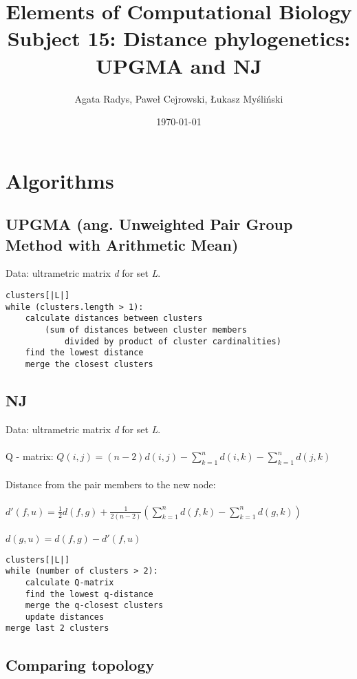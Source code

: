 \documentclass[a4paper,10pt]{article}
\title{Elements of Computational Biology\\ \Large
Subject 15: Distance phylogenetics: UPGMA and NJ}
\author{Agata Radys, Paweł Cejrowski, Łukasz Myśliński}
\date{\today}
\begin{document}
\maketitle

\section{Algorithms}

\subsection{UPGMA (ang. Unweighted Pair Group Method with Arithmetic Mean)}
Data: ultrametric matrix \textit{d} for set \textit{L}.
\begin{lstlisting}[caption={UPGMA pseudocode}]
clusters[|L|]
while (clusters.length > 1):
    calculate distances between clusters
        (sum of distances between cluster members
            divided by product of cluster cardinalities)
    find the lowest distance
    merge the closest clusters
\end{lstlisting}

\subsection{NJ}
Data: ultrametric matrix \textit{d} for set \textit{L}.\\ \\
Q - matrix: $ Q(i,j) = (n-2)d(i,j) - \sum_{k=1}^{n} d(i,k) - \sum_{k=1}^{n} d(j,k)$ \\ \\
Distance from the pair members to the new node: \\ \\
$d'(f,u) = \frac{1}{2}d(f,g) + \frac{1}{2(n-2)}(\sum_{k=1}^n d(f,k) - \sum_{k=1}^n d(g,k))$ \\ \\
$d(g,u) = d(f,g) - d'(f,u)$

\begin{lstlisting}[caption={NJ pseudocode}]
clusters[|L|]
while (number of clusters > 2):
    calculate Q-matrix
    find the lowest q-distance
    merge the q-closest clusters
    update distances
merge last 2 clusters
\end{lstlisting}


\subsection{Comparing topology}
\end{document}
